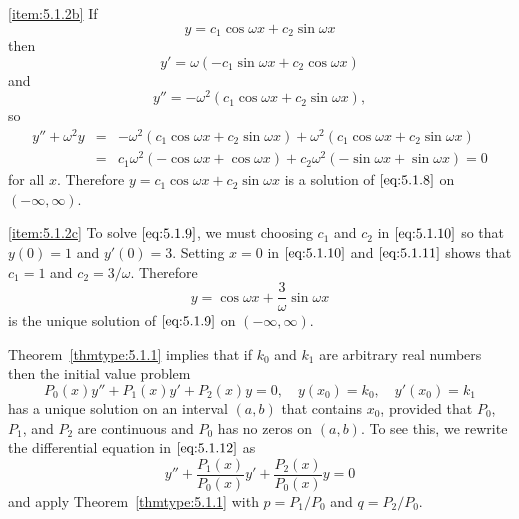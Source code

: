 \documentclass{ximera}
\begin{document}
\begin{example}
\begin{explanation}
\ref{item:5.1.2b} If
\begin{equation}\label{eq:5.1.10}
y=c_1\cos\omega x+c_2\sin\omega x
\end{equation}
 then
\begin{equation}\label{eq:5.1.11}
y'=\omega(-c_1\sin\omega x+c_2\cos\omega x)
\end{equation}
and
$$
y''=-\omega^2(c_1\cos\omega x+c_2\sin\omega x),
$$
so
\begin{eqnarray*}
y''+\omega^2y&=& -\omega^2(c_1\cos\omega x+c_2\sin\omega x)
+\omega^2(c_1\cos\omega x+c_2\sin\omega x)\\
&=&c_1\omega^2(-\cos\omega x+\cos\omega x)+
c_2\omega^2(-\sin\omega x+\sin\omega x)=0
\end{eqnarray*}
for all $x$. Therefore $y=c_1\cos\omega x+c_2\sin\omega x$ is a
solution of $\eqref{eq:5.1.8}$ on $(-\infty,\infty)$.
 
\ref{item:5.1.2c}
To solve
$\eqref{eq:5.1.9}$, we must choosing $c_1$ and $c_2$ in $\eqref{eq:5.1.10}$
so that $y(0)=1$ and $y'(0)=3$. Setting $x=0$ in $\eqref{eq:5.1.10}$
and $\eqref{eq:5.1.11}$ shows that $c_1=1$ and $c_2=3/\omega$.
Therefore
$$
y=\cos\omega x+\frac{3}{\omega}\sin\omega x
$$
 is the unique solution of $\eqref{eq:5.1.9}$ on
$(-\infty,\infty)$.
\end{explanation}
\end{example}
 
Theorem~\ref{thmtype:5.1.1} implies that if $k_0$ and $k_1$ are
arbitrary real numbers then the initial value problem
\begin{equation}\label{eq:5.1.12}
P_0(x)y''+P_1(x)y'+P_2(x)y=0,\quad y(x_0)=k_0,\quad y'(x_0)=k_1
\end{equation}
has a unique solution on an interval $(a,b)$ that contains $x_0$,
provided that $P_0$, $P_1$, and $P_2$ are continuous and $P_0$
has no zeros on $(a,b)$. To see this, we rewrite the differential
equation in  $\eqref{eq:5.1.12}$ as
$$
y''+\frac{P_1(x)}{P_0(x)}y'+\frac{P_2(x)}{P_0(x)}y=0
$$
and apply Theorem~\ref{thmtype:5.1.1} with $p=P_1/P_0$ and $q=P_2/P_0$.
 
\end{document}

